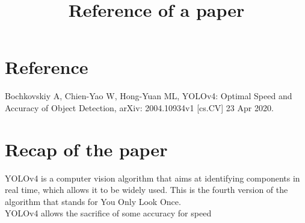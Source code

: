 \documentclass{article}
\title{Reference of a paper}
\begin{document}
\maketitle

\section{Reference} Bochkovskiy A, Chien-Yao W, Hong-Yuan ML, YOLOv4: Optimal Speed and Accuracy of Object Detection, arXiv: 2004.10934v1 [cs.CV] 23 Apr 2020.

\section{Recap of the paper}
YOLOv4 is a computer vision algorithm that aims at identifying components in real time, which allows it to be widely used. This is the fourth version of the algorithm that stands for You Only Look Once. \\
YOLOv4 allows the sacrifice of some accuracy for speed  

\cite{bodla_soft-nms_2017}
\cite{cai_cascade_2018}
\cite{chao_hardnet_2019}
\cite{cao_hierarchical_2019}
\cite{chen_gridmask_2020}
\cite{chen_deeplab_2017}
\cite{chen_deeplab_2017-1}
\cite{chen_deeplab_2017-2}



\end{document}
